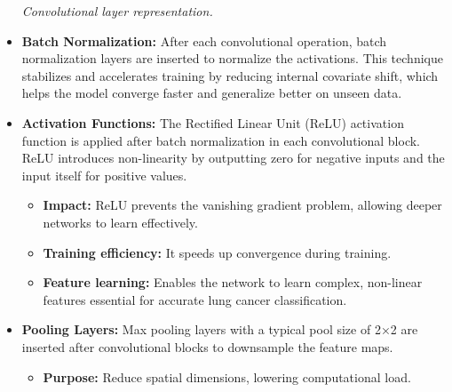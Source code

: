 \begin{itemize}
\begin{center}
        \small\textit{Convolutional layer representation. \cite{ar2019}}
    \end{center}
    \vspace{1em}

    \item \textbf{Batch Normalization:} After each convolutional operation, batch normalization 
    layers are inserted to normalize the activations. This technique stabilizes and accelerates 
    training by reducing internal covariate shift, which helps the model converge faster and 
    generalize better on unseen data. \cite{sr2025}

    \item \textbf{Activation Functions:} The Rectified Linear Unit (ReLU) activation function is 
    applied after batch normalization in each convolutional block. ReLU introduces non-linearity by 
    outputting zero for negative inputs and the input itself for positive values.

        \begin{itemize}
            \item \textbf{Impact:} ReLU prevents the vanishing gradient problem, allowing deeper 
            networks to learn effectively.

            \item \textbf{Training efficiency:} It speeds up convergence during training.
            
            \item \textbf{Feature learning:} Enables the network to learn complex, non-linear 
            features essential for accurate lung cancer classification. \cite{sr2025}
        \end{itemize}

    \item \textbf{Pooling Layers:} Max pooling layers with a typical pool size of 2×2 are inserted 
    after convolutional blocks to downsample the feature maps.

        \begin{itemize}
            \item \textbf{Purpose:} Reduce spatial dimensions, lowering computational load.
            

\end{itemize}
\end{itemize}
